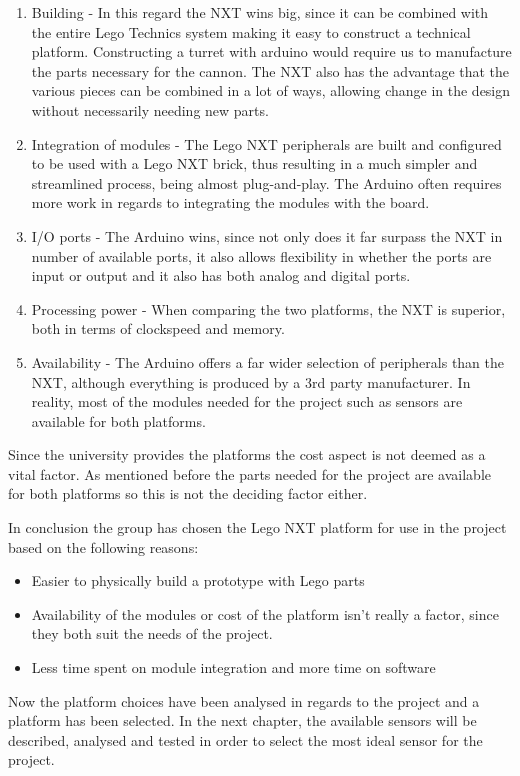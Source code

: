 \begin{enumerate}
  \item Building - In this regard the NXT wins big, since it can be combined
  with the entire Lego Technics system making it easy to construct a
  technical platform. Constructing a turret with arduino would require us to
  manufacture the parts necessary for the cannon. The NXT also has the
  advantage that the various pieces can be combined in a lot of ways, allowing
  change in the design without necessarily needing new parts.
  \item Integration of modules - The Lego NXT peripherals are built and
  configured to be used with a Lego NXT brick, thus resulting in a much simpler
  and streamlined process, being almost plug-and-play. The Arduino often
  requires more work in regards to integrating the modules with the board.
  \item I/O ports - The Arduino wins, since not only does it far surpass
  the NXT in number of available ports, it also allows flexibility in
  whether the ports are input or output and it also has both analog
  and digital ports.
  \item Processing power - When comparing the two platforms, the NXT is
  superior, both in terms of clockspeed and memory.
  \item Availability - The Arduino offers a far wider selection of peripherals
  than the NXT, although everything is produced by a 3rd party manufacturer. In
  reality, most of the modules needed for the project such as sensors are
  available for both platforms.
\end{enumerate}

Since the university provides the platforms the cost aspect is not deemed as a
vital factor. As mentioned before the parts needed for the project are
available for both platforms so this is not the deciding factor either.

In conclusion the group has chosen the Lego NXT platform for use in the project
based on the following reasons:
\begin{itemize}
  \item Easier to physically build a prototype with Lego parts
  \item Availability of the modules or cost of the platform isn't really a
  factor, since they both suit the needs of the project.
  \item Less time spent on module integration and more time on software
\end{itemize}

Now the platform choices have been analysed in regards to the project and a
platform has been selected. In the next chapter, the available sensors will be
described, analysed and tested in order to select the most ideal sensor for the
project.